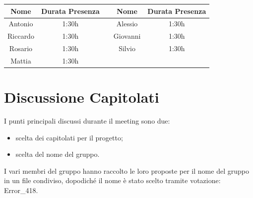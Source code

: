 \documentclass[12pt,a4paper]{article}
\begin{document}
\begin{center}
    \begin{tabular}{ |c|c|c|c|c| }
        \hline
        Nome     & Durata Presenza &  & Nome     & Durata Presenza \\
        \hline
        Antonio  & 1:30h           &  & Alessio  & 1:30h           \\
        \hline
        Riccardo & 1:30h           &  & Giovanni & 1:30h           \\
        \hline
        Rosario  & 1:30h           &  & Silvio   & 1:30h           \\
        \hline
        Mattia   & 1:30h           &  &          &                 \\
        \hline

    \end{tabular}
\end{center}

\newpage

\section{Discussione Capitolati}
I punti principali discussi durante il meeting sono due:
\begin{itemize}
    \item scelta dei capitolati per il progetto;
    \item scelta del nome del gruppo.
\end{itemize}

I vari membri del gruppo hanno raccolto le loro proposte per il nome del gruppo
in
un file condiviso, dopodiché il nome è stato scelto tramite votazione: Error\_418.
\end{document}
